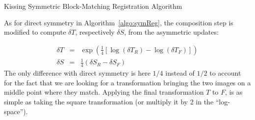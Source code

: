 \begin{algorithm}[!htbp]
\caption{Kissing Symmetric Block-Matching Registration Algorithm}
\label{algo:kSymReg}
\begin{algorithmic}[1]
    \ENDFOR
  \ENDFOR
\end{algorithmic}
\end{algorithm}
As for direct symmetry in Algorithm~\ref{algo:symReg}, the composition step is modified to compute $\delta T$, respectively $\delta S$, from the asymmetric updates:

\begin{eqnarray}
	\delta T & = & \exp\left(\frac{1}{4} \left[\log(\delta T_R) - \log(\delta T_F)\right] \right) \\
	\delta S & = & \frac{1}{4} \left(\delta S_R - \delta S_F\right)
\end{eqnarray}
The only difference with direct symmetry is here $1/4$ instead of $1/2$ to account for the fact that we are looking for a transformation bringing the two images on a middle point where they match. Applying the final transformation $T$ to $F$, is as simple as taking the square transformation (or multiply it by 2 in the ``log-space'').


